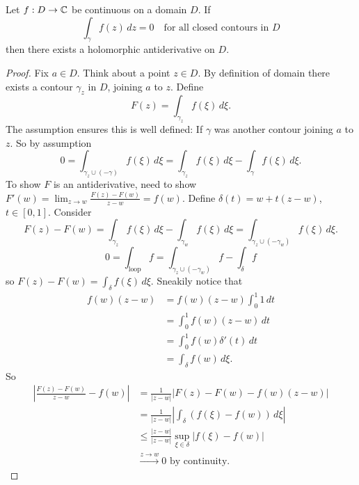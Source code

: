 \documentclass[10pt, a4paper]{article}
\begin{document}
\begin{theorem}
    Let $f : D \to \mathbb{C}$ be continuous on a domain $D$.
    If
    \[
    \int_{\gamma}f(z)\,dz = 0\quad\text{for all closed contours in $D$}
    \]
    then there exists a holomorphic antiderivative on $D$.

    \begin{proof}
        Fix $a \in D$.
        Think about a point $z \in D$.
        By definition of domain there exists a contour $\gamma_z$ in $D$,
        joining $a$ to $z$.
        Define
        \[
        F(z) = \int_{\gamma_z}f(\xi)\,d\xi.
        \]
        The assumption ensures this is well defined:
        If $\gamma$ was another contour joining $a$ to $z$.
        So by assumption
        \[
        0 = \int_{\gamma_z \cup (-\gamma)}f(\xi)\,d\xi = \int_{\gamma_z}f(\xi)\,d\xi - \int_{\gamma}f(\xi)\,d\xi.
        \]
        To show $F$ is an antiderivative,
        need to show $F'(w) = \lim_{z \to w}\frac{F(z) - F(w)}{z - w} = f(w)$.
        Define $\delta(t) = w + t(z - w)$,
        $t \in [0, 1]$.
        Consider
        \[
        F(z) - F(w) = \int_{\gamma_z}f(\xi)\,d\xi - \int_{\gamma_w}f(\xi)\,d\xi = \int_{\gamma_z\cup(-\gamma_w)}f(\xi)\,d\xi.
        \]
        \[
        0 = \int_{\text{loop}} f = \int_{\gamma_z \cup (-\gamma_w)}f - \int_{\delta}f
        \]
        so $F(z) - F(w) = \int_{\delta}f(\xi)\,d\xi$.
        Sneakily notice that
        \begin{align*}
            f(w)(z - w) &= f(w)(z - w)\int_{0}^{1}1\,dt \\
            &= \int_{0}^{1}f(w)(z - w)\,dt \\
            &= \int_{0}^{1}f(w)\delta'(t)\,dt \\
            &= \int_{\delta}f(w)\,d\xi.
        \end{align*}
        So
        \begin{align*}
            \left|\frac{F(z) - F(w)}{z - w} - f(w)\right| &= \frac{1}{|z - w|}|F(z) - F(w) - f(w)(z - w)| \\
            &= \frac{1}{|z - w|}\left|\int_{\delta}(f(\xi) - f(w))\,d\xi\right| \\
            &\leq \frac{|z - w|}{|z - w|}\sup_{\xi \in \delta}|f(\xi) - f(w)| \\
            &\overset{z \to w}{\to} 0\text{ by continuity}.
        \end{align*}
    \end{proof}
\end{theorem}
\end{document}
